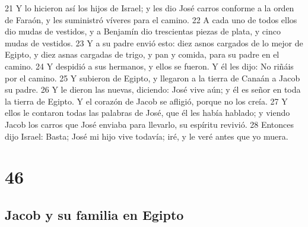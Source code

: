 21 Y lo hicieron así los hijos de Israel; y les dio José carros conforme a la orden de Faraón, y les suministró víveres para el camino.
22 A cada uno de todos ellos dio mudas de vestidos, y a Benjamín dio trescientas piezas de plata, y cinco mudas de vestidos.
23 Y a su padre envió esto: diez asnos cargados de lo mejor de Egipto, y diez asnas cargadas de trigo, y pan y comida, para su padre en el camino.
24 Y despidió a sus hermanos, y ellos se fueron. Y él les dijo: No riñáis por el camino.
25 Y subieron de Egipto, y llegaron a la tierra de Canaán a Jacob su padre.
26 Y le dieron las nuevas, diciendo: José vive aún; y él es señor en toda la tierra de Egipto. Y el corazón de Jacob se afligió, porque no los creía.
27 Y ellos le contaron todas las palabras de José, que él les había hablado; y viendo Jacob los carros que José enviaba para llevarlo, su espíritu revivió.
28 Entonces dijo Israel: Basta; José mi hijo vive todavía; iré, y le veré antes que yo muera.

\chapter{46}

\section{Jacob y su familia en Egipto}

